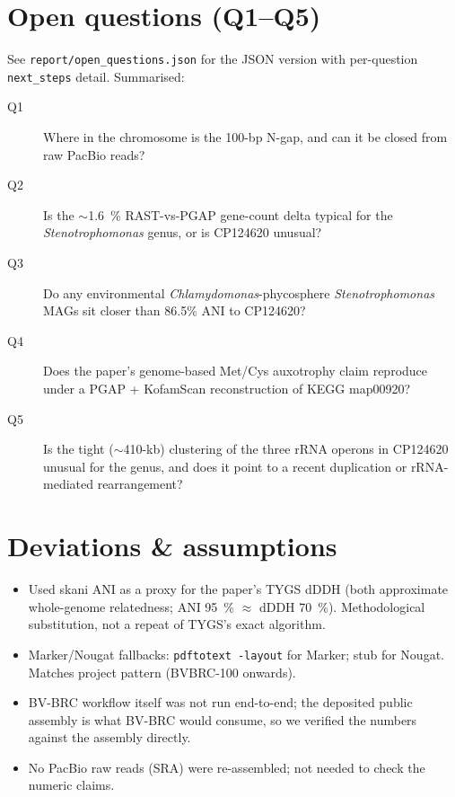 \documentclass[11pt]{article}
\begin{document}
\section{Open questions (Q1--Q5)}

See \verb|report/open_questions.json| for the JSON version with per-question
\verb|next_steps| detail. Summarised:

\begin{description}
\item[Q1] Where in the chromosome is the 100-bp N-gap, and can it be closed from raw PacBio reads?
\item[Q2] Is the $\sim$1.6~\% RAST-vs-PGAP gene-count delta typical for the \emph{Stenotrophomonas} genus, or is CP124620 unusual?
\item[Q3] Do any environmental \emph{Chlamydomonas}-phycosphere \emph{Stenotrophomonas} MAGs sit closer than 86.5\% ANI to CP124620?
\item[Q4] Does the paper's genome-based Met/Cys auxotrophy claim reproduce under a PGAP + KofamScan reconstruction of KEGG map00920?
\item[Q5] Is the tight ($\sim$410-kb) clustering of the three rRNA operons in CP124620 unusual for the genus, and does it point to a recent duplication or rRNA-mediated rearrangement?
\end{description}

\section{Deviations \& assumptions}
\begin{itemize}
\item Used skani ANI as a proxy for the paper's TYGS dDDH (both approximate whole-genome relatedness; ANI 95~\% $\approx$ dDDH 70~\%). Methodological substitution, not a repeat of TYGS's exact algorithm.
\item Marker/Nougat fallbacks: \texttt{pdftotext -layout} for Marker; stub for Nougat. Matches project pattern (BVBRC-100 onwards).
\item BV-BRC workflow itself was not run end-to-end; the deposited public assembly is what BV-BRC would consume, so we verified the numbers against the assembly directly.
\item No PacBio raw reads (SRA) were re-assembled; not needed to check the numeric claims.
\end{itemize}
\end{document}
